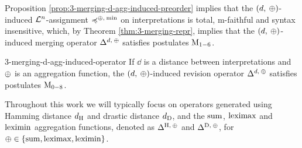 Proposition \ref{prop:3-merging-d-agg-induced-preorder} 
implies that the $({d,\:{\operatorname{\oplus}}})$-induced $\mathcal{L}^n$-assignment
$\preccurlyeq^{{\operatorname{\oplus}},\:{\operatorname{min}}}$ on interpretations  
is total, m-faithful and syntax insensitive, 
which, by Theorem \ref{thm:3-merging-repr}, 
implies that the $({d,\:{\operatorname{\oplus}}})$-induced merging operator 
$\Delta^{d,\:{\operatorname{\oplus}}}$ satisfies postulates $\mathrm{M}_{1-6}$.

\begin{crl}{}{3-merging-d-agg-induced-operator}
	If $\dd$ is a distance between interpretations
	and ${\operatorname{\oplus}}$ is an aggregation function,
	the $(d,\:{\operatorname{\oplus}})$-induced revision operator $\Delta^{d,\:{\operatorname{\oplus}}}$ 
	satisfies postulates $\mathrm{M}_{0-8}$.
\end{crl}

Throughout this work we will typically focus on 
operators generated using Hamming distance $d_{{\operatorname{H}}}$
and drastic distance $d_{{\operatorname{D}}}$,
and the ${\operatorname{sum}}$, ${\operatorname{leximax}}$ and ${\operatorname{leximin}}$ aggregation functions,
denoted as $\Delta^{{\operatorname{H}},\:{\operatorname{\oplus}}}$ and $\Delta^{{\operatorname{D}},\:{\operatorname{\oplus}}}$,
for ${\operatorname{\oplus}}\in\{{\operatorname{sum}},{\operatorname{leximax}},{\operatorname{leximin}}\}$.

